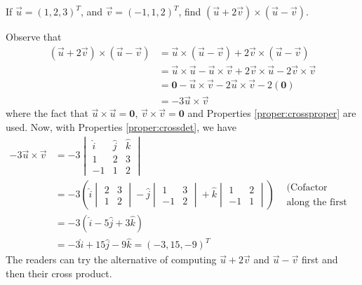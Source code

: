 \begin{exmp}
If $\vec{u} = (1,2,3)^T$, and $\vec{v} = (-1,1,2)^T$, find $(\vec{u} + 2\vec{v}) \times (\vec{u} - \vec{v}) $.
\end{exmp}
\begin{solution}
Observe that
\begin{align*}
(\vec{u} + 2\vec{v}) \times (\vec{u} - \vec{v}) &= \vec{u} \times (\vec{u} - \vec{v}) + 2\vec{v} \times (\vec{u} - \vec{v}) \\
&= \vec{u} \times \vec{u} - \vec{u} \times \vec{v} + 2\vec{v} \times \vec{u} - 2\vec{v} \times \vec{v} \\
&= \textbf{0} - \vec{u} \times \vec{v} - 2\vec{u} \times \vec{v} - 2(\textbf{0}) \\
&= -3\vec{u} \times \vec{v}
\end{align*}
where the fact that $\vec{u} \times \vec{u} = \textbf{0}$, $\vec{v} \times \vec{v} = \textbf{0}$ and Properties \ref{proper:crossproper} are used. Now, with Properties \ref{proper:crossdet}, we have
\begin{align*}
-3\vec{u} \times \vec{v} &=  
-3
\begin{vmatrix}
\hat{i} & \hat{j} & \hat{k} \\
1 & 2 & 3 \\
-1 & 1 & 2
\end{vmatrix} \\
&= -3\left(\hat{i}
\begin{vmatrix}
2 & 3 \\
1 & 2 
\end{vmatrix}
- \hat{j}
\begin{vmatrix}
1 & 3 \\
-1 & 2
\end{vmatrix}
+ \hat{k}
\begin{vmatrix}
1 & 2 \\
-1 & 1 
\end{vmatrix}\right) & \begin{aligned}
\text{(Cofactor expansion} \\ 
\text{along the first row)}
\end{aligned} \\
&= -3(\hat{i}-5\hat{j}+3\hat{k}) \\
&= -3\hat{i}+15\hat{j}-9\hat{k} = (-3,15,-9)^T
\end{align*}
The readers can try the alternative of computing $\vec{u}+2\vec{v}$ and $\vec{u} - \vec{v}$ first and then their cross product.
\end{solution}

